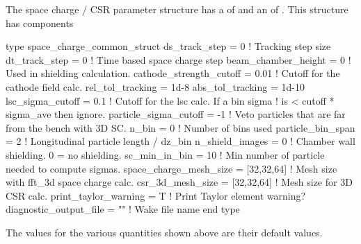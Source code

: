 {The space charge / CSR parameter structure has a  of 
and an  of . This structure has components
\begin{example}
  type space_charge_common_struct 
    ds_track_step = 0                   ! Tracking step size
    dt_track_step = 0                   ! Time based space charge step
    beam_chamber_height = 0             ! Used in shielding calculation.
    cathode_strength_cutoff = 0.01      ! Cutoff for the cathode field calc.
    rel_tol_tracking = 1d-8
    abs_tol_tracking = 1d-10            
    lsc_sigma_cutoff = 0.1              ! Cutoff for the lsc calc. If a bin sigma
                                        !  is < cutoff * sigma_ave then ignore.
    particle_sigma_cutoff = -1          ! Veto particles that are far from the bench with 3D SC.
    n_bin = 0                           ! Number of bins used
    particle_bin_span = 2               ! Longitudinal particle length / dz_bin
    n_shield_images = 0                 ! Chamber wall shielding. 0 = no shielding.
    sc_min_in_bin = 10                  ! Min number of particle needed to compute sigmas.
    space_charge_mesh_size = [32,32,64] ! Mesh size with fft_3d space charge calc.
    csr_3d_mesh_size = [32,32,64]       ! Mesh size for 3D CSR calc.
    print_taylor_warning = T            ! Print Taylor element warning?
    diagnostic_output_file = ""         ! Wake file name
  end type
\end{example}
The values for the various quantities shown above are their default values. 

}
